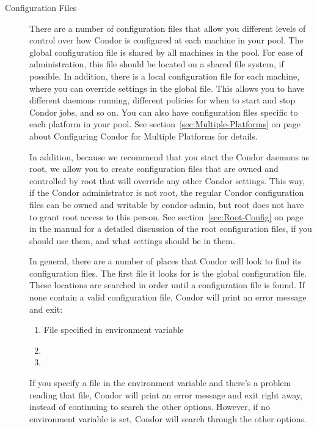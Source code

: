 \begin{description}
\item[Configuration Files] There are a number of configuration files
that allow you
different levels of control over how Condor is configured at each
machine in your pool.  
The global configuration file is shared by all machines in the pool.
For ease of administration, this file should be located on a shared
file system, if possible.
In addition, there is a local
configuration file for each machine, where you can override settings in the
global file.  This allows you to have different daemons running,
different policies for when to start and stop Condor jobs, and so on.
You can also have configuration files specific to each platform in your pool.
See
section~\ref{sec:Multiple-Platforms} on
page~\pageref{sec:Multiple-Platforms} about Configuring Condor for
Multiple Platforms for details.

In addition, because we recommend that you start the Condor daemons as
root, we allow you to create configuration files that are owned and
controlled by root that will override any other Condor settings.  This
way, if the Condor administrator is not root, the regular Condor configuration
files can be owned and writable by condor-admin, but root does not have
to grant root access to this person.  See
section~\ref{sec:Root-Config} on page~\pageref{sec:Root-Config} in the
manual for a detailed discussion of the root configuration files, if you
should use them, and what settings should be in them.

In general, there are a number of places that Condor will look to find
its configuration files.  The first file it looks for is the global configuration
file.  These locations are searched in order until a configuration file is
found.  If none contain a valid configuration file, Condor will print an
error message and exit:
\begin{enumerate}
   \item File specified in  environment variable
   \item {}
   \item {}
\end{enumerate}

If you specify a file in the  environment variable
and there's a problem reading that file, Condor will print an error
message and exit right away, instead of continuing to search the other
options.
However, if no  environment variable is set,
Condor will search through the other options.


\end{description}
